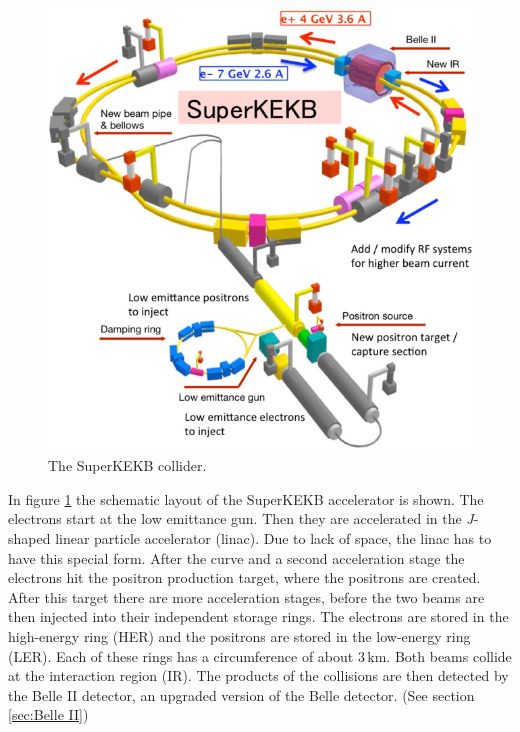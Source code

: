 \documentclass[a4paper,11pt,twosided,final,german,openbib,pdftex,listof=totoc,bibliography=totoc]{scrbook}
\begin{document}
\begin{figure}[h!]
\begin{center}
	\includegraphics[width=\textwidth]{Bilder/SuperKEKB.png}
	
	\caption[SuperKEKB Collider]{The SuperKEKB collider.\cite{SKEKAcc}}
	\label{fig:SuperKEKB}
\end{center}
\end{figure}


In figure \ref{fig:SuperKEKB} the schematic layout of the SuperKEKB accelerator is shown. The electrons start at the low emittance gun. Then they are accelerated in the \textit{J}-shaped linear particle accelerator (linac). Due to lack of space, the linac has to have this special form.\cite{KEKBJArc} After the curve and a second acceleration stage the electrons hit the positron production target, where the positrons are created. After this target there are more acceleration stages, before the two beams are then injected into their independent storage rings. The electrons are stored in the high-energy ring (HER) and the positrons are stored in the low-energy ring (LER). Each of these rings has a circumference of about $3\,\textrm{km}$. Both beams collide at the interaction region (IR). The products of the collisions are then detected by the Belle II detector, an upgraded version of the Belle detector.\cite{B2B} (See section \ref{sec:Belle II})
\end{document}
